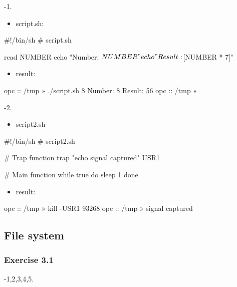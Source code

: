 \documentclass[a4paper]{article}
\begin{document}
{-\allowbreak}1.

\begin{itemize}
\item 
script.sh:
\end{itemize}

\begin{plain}
#!/bin/sh
# script.sh

read NUMBER
echo "Number: $NUMBER"
echo "Result: $[NUMBER * 7]"
\end{plain}

\begin{itemize}
\item 
result:
\end{itemize}

\begin{plain}
opc :: /tmp » ./script.sh                                  
8
Number: 8
Result: 56
opc :: /tmp » 
\end{plain}

{-\allowbreak}2. 

\begin{itemize}
\item 
script2.sh
\end{itemize}

\begin{plain}
#!/bin/sh
# script2.sh

# Trap function
trap "echo signal captured" USR1

# Main function
while true
do
        sleep 1
done
\end{plain}

\begin{itemize}
\item 
result:
\end{itemize}

\begin{plain}
opc :: /tmp » kill -USR1 93268      
opc :: /tmp » signal captured
\end{plain}

\clearpage

\subsection{File system}

\subsubsection{Exercise 3.1}

{-\allowbreak}1,2,3,4,5.
\end{document}
